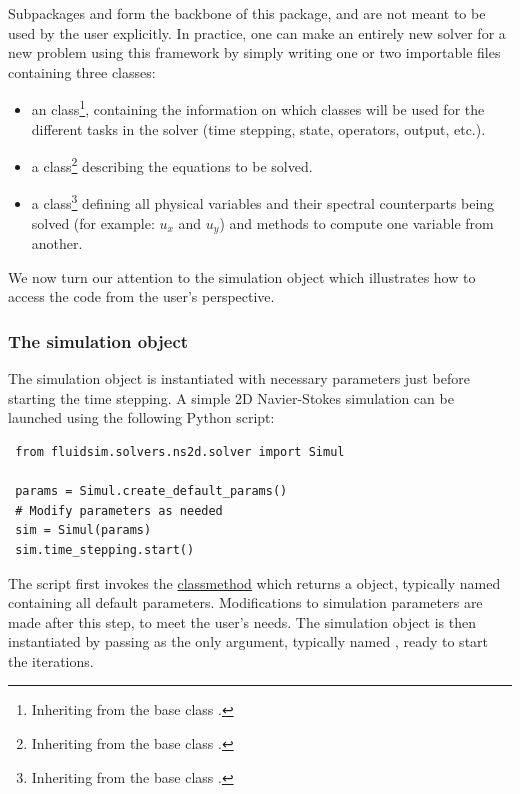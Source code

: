 \documentclass{../jors}
\begin{document}
Subpackages  and  form the backbone of this
package, and are not meant to be used by the user explicitly.
%
In practice, one can make an entirely new solver for a new problem using this
framework by simply writing one or two importable files containing three classes:
\begin{itemize}
\item an  class\footnote{Inheriting from the base class
.}, containing the
information on which classes will be used for the different tasks in the solver
(time stepping, state, operators, output, etc.).
\item a  class\footnote{Inheriting from the base class
.} describing the equations to be
solved.
\item a  class\footnote{Inheriting from the base class
.} defining all physical variables and
their spectral counterparts being solved (for example: $u_x$ and $u_y$) and
methods to compute one variable from another.
\end{itemize}

We now turn our attention to the simulation object which illustrates how to
access the code from the user's perspective.

\subsubsection*{The simulation object}

The simulation object is instantiated with necessary parameters just before
starting the time stepping.  A simple 2D Navier-Stokes simulation can be
launched using the following Python script:

\begin{verbatim}
 from fluidsim.solvers.ns2d.solver import Simul

 params = Simul.create_default_params()
 # Modify parameters as needed
 sim = Simul(params)
 sim.time_stepping.start()
\end{verbatim}

The script first invokes the 
\href{https://docs.python.org/3/library/functions.html#classmethod}{classmethod}
which returns a  object, typically named
 containing all default parameters.
%
Modifications to simulation parameters are made after this step, to meet the
user's needs. The simulation object is then instantiated by passing
 as the only argument, typically named ,
ready to start the iterations.
\end{document}

